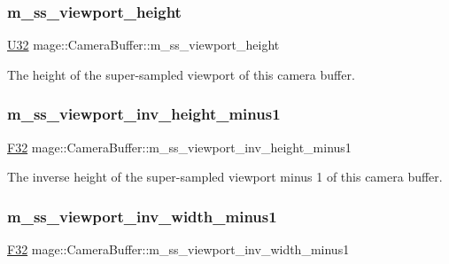 \subsubsection{\texorpdfstring{m\+\_\+ss\+\_\+viewport\+\_\+height}{m\_ss\_viewport\_height}}
{\footnotesize\ttfamily \hyperlink{namespacemage_a41c104c036fba3756a74e19f793eeaa1}{U32} mage\+::\+Camera\+Buffer\+::m\+\_\+ss\+\_\+viewport\+\_\+height}

The height of the super-\/sampled viewport of this camera buffer. \hypertarget{structmage_1_1_camera_buffer_a62f3a9c95c3e3cecfc1744de82ac2ca2}{}\label{structmage_1_1_camera_buffer_a62f3a9c95c3e3cecfc1744de82ac2ca2} 
\subsubsection{\texorpdfstring{m\+\_\+ss\+\_\+viewport\+\_\+inv\+\_\+height\+\_\+minus1}{m\_ss\_viewport\_inv\_height\_minus1}}
{\footnotesize\ttfamily \hyperlink{namespacemage_aa97e833b45f06d60a0a9c4fc22ae02c0}{F32} mage\+::\+Camera\+Buffer\+::m\+\_\+ss\+\_\+viewport\+\_\+inv\+\_\+height\+\_\+minus1}

The inverse height of the super-\/sampled viewport minus 1 of this camera buffer. \hypertarget{structmage_1_1_camera_buffer_ad881a3acbf1eed761374a50296e35e47}{}\label{structmage_1_1_camera_buffer_ad881a3acbf1eed761374a50296e35e47} 
\subsubsection{\texorpdfstring{m\+\_\+ss\+\_\+viewport\+\_\+inv\+\_\+width\+\_\+minus1}{m\_ss\_viewport\_inv\_width\_minus1}}
{\footnotesize\ttfamily \hyperlink{namespacemage_aa97e833b45f06d60a0a9c4fc22ae02c0}{F32} mage\+::\+Camera\+Buffer\+::m\+\_\+ss\+\_\+viewport\+\_\+inv\+\_\+width\+\_\+minus1}

